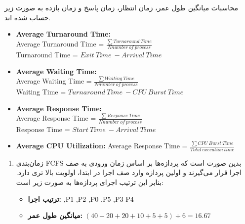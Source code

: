 \begin{qsolve}
	
	محاسبات میانگین طول عمر، زمان انتظار، زمان پاسخ و زمان بازده به صورت زیر حساب شده اند.
	
	\begin{latin}
		
		\begin{itemize}
			\item \textbf{Average Turnaround Time:}\\
			Average Turnaround Time = $ \frac{\sum Turnaround\ Time​}{Nnumber\ of\ process} $ \\
			Turnaround Time = $ Exit\ Time\ - Arrival\ Time $
			
			\item \textbf{Average Waiting Time:}\\
			Average Waiting Time = $ \frac{\sum Waiting\ Time​}{Nnumber\ of\ process} $ \\
			Waiting Time = $ Turnaround\ Time\ - CPU\ Burst\ Time $
			
			\item \textbf{Average Response Time:}\\
			Average Response Time = $ \frac{\sum Response\ Time​}{Nnumber\ of\ process} $ \\
			Response Time = $ Start\ Time\ - Arrival\ Time $
			
			\item \textbf{Average CPU Utilization:}
			Average Response Time = $ \frac{\sum CPU\ Burst\ Time​}{Total\ execution\ time} $ \\
			
		\end{itemize}
		
		
		
		
		
	\end{latin}
	
	\begin{enumerate}
		\item زمان‌بندی FCFS بدین صورت است که پردازه‌ها بر اساس زمان ورودی به صف اجرا قرار می‌گیرند و اولین پردازه وارد صف اجرا در ابتدا، اولویت بالا تری دارد. بنابر این
		ترتیب اجرای پردازه‌ها به صورت زیر است:
		
		\begin{itemize}
			\item \textbf{ترتیب اجرا: },P1 ,P2 ,P0 ,P5 ,P3 P4
			
			\item \textbf{میانگین طول عمر: }
			$ (40 + 20 + 20 + 10 + 5 + 5) \div 6 = 16.67$
			

\end{itemize}
\end{enumerate}
\end{qsolve}
